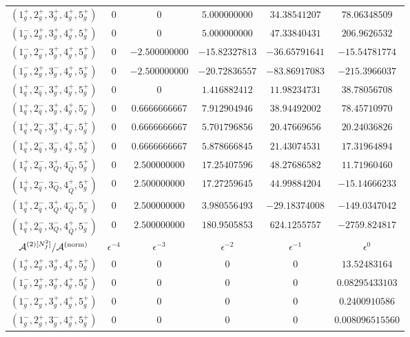 \begin{table}[!htbp]
\begin{adjustbox}{width=1\textwidth}
\begin{tabular}{cccccc}
      \midrule
      $( 1_g^+, 2_g^+, 3_g^+, 4_g^+, 5_g^+ )$ & 0 & 0 & $5.000000000$ & $34.38541207$ & $78.06348509$ \\
      $( 1_g^-, 2_g^+, 3_g^+, 4_g^+, 5_g^+ )$ & 0 & 0 & $5.000000000$ & $47.33840431$ & $206.9626532$ \\
      $( 1_g^-, 2_g^-, 3_g^+, 4_g^+, 5_g^+ )$ & 0 & $-2.500000000$ & $-15.82327813$ & $-36.65791641$ & $-15.54781774$ \\
      $( 1_g^-, 2_g^+, 3_g^-, 4_g^+, 5_g^+ )$ & 0 & $-2.500000000$ & $-20.72836557$ & $-83.86917083$ & $-215.3966037$ \\
      \midrule
      $( 1_q^+, 2_{\bar q}^-, 3_g^+, 4_g^+, 5_g^+ )$ & 0 & 0 & $1.416882412$ & $11.98234731$ & $38.78056708$ \\
      $( 1_q^+, 2_{\bar q}^-, 3_g^+, 4_g^+, 5_g^- )$ & 0 & $0.6666666667$ & $7.912904946$ & $38.94492002$ & $78.45710970$ \\
      $( 1_q^+, 2_{\bar q}^-, 3_g^+, 4_g^-, 5_g^+ )$ & 0 & $0.6666666667$ & $5.701796856$ & $20.47669656$ & $20.24036826$ \\
      $( 1_q^+, 2_{\bar q}^-, 3_g^-, 4_g^+, 5_g^+ )$ & 0 & $0.6666666667$ & $5.878666845$ & $21.43074531$ & $17.31964894$ \\
      \midrule
      $( 1_q^+, 2_{\bar q}^-, 3_Q^+, 4_{\bar Q}^-, 5_g^+ )$ & 0 & $2.500000000$ & $17.25407596$ & $48.27686582$ & $11.71960460$ \\
      $( 1_q^+, 2_{\bar q}^-, 3_Q^-, 4_{\bar Q}^+, 5_g^+ )$ & 0 & $2.500000000$ & $17.27259645$ & $44.99884204$ & $-15.14666233$ \\
      $( 1_q^+, 2_{\bar q}^-, 3_Q^+, 4_{\bar Q}^-, 5_g^- )$ & 0 & $2.500000000$ & $3.980556493$ & $-29.18374008$ & $-149.0347042$ \\
      $( 1_q^+, 2_{\bar q}^-, 3_Q^-, 4_{\bar Q}^+, 5_g^- )$ & 0 & $2.500000000$ & $180.9505853$ & $624.1255757$ & $-2759.824817$ \\
      \midrule
      $\mathcal{A}^{(2)[N_f^2]}/\mathcal{A}^\mathrm{(norm)}$	  &   $\epsilon^{-4}$   &   $\epsilon^{-3}$   &   $\epsilon^{-2}$   &   $\epsilon^{-1}$   &   $\epsilon^{0}$   \\
      \midrule
      $( 1_g^+, 2_g^+, 3_g^+, 4_g^+, 5_g^+ )$ & 0 & 0 & 0 & 0 & $13.52483164$ \\
      $( 1_g^-, 2_g^+, 3_g^+, 4_g^+, 5_g^+ )$ & 0 & 0 & 0 & 0 & $0.08295433103$ \\
      $( 1_g^-, 2_g^-, 3_g^+, 4_g^+, 5_g^+ )$ & 0 & 0 & 0 & 0 & $0.2400910586$ \\
      $( 1_g^-, 2_g^+, 3_g^-, 4_g^+, 5_g^+ )$ & 0 & 0 & 0 & 0 & $0.008096515560$ \\

\end{tabular}
\end{adjustbox}
\end{table}
